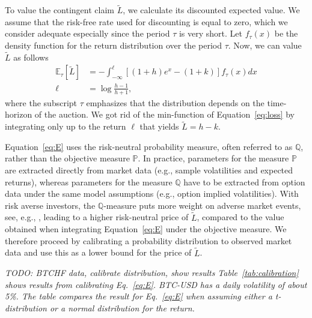 \documentclass[english,11pt]{article}
\begin{document}
To value the contingent claim $\tilde{L}$, we calculate its discounted expected
value. We assume that the risk-free rate used for discounting is equal to zero,
which we consider adequate especially since the period $\tau$ is very short.
Let $f_{\tau}(x)$ be the density function for the return distribution over the period $\tau$. Now, we can value $\tilde{L}$ as follows
\begin{align}
\mathbb{E}_{\tau}\left[\tilde{L} \right] &= - \int_{-\infty}^{\ell} \left[(1 + h) e^{x} - (1+k) \right] f_{\tau}(x) dx\label{eq:E}\\
\ell &= \log \frac{h-1}{h+1},
\end{align}
where the subscript $\tau$ emphasizes that the distribution depends on the time-horizon of the auction. We got rid of the min-function of Equation~\eqref{eq:loss} by
integrating only up to the return $\ell$ that yields $\tilde{L}=h-k$.

Equation~\eqref{eq:E} uses the risk-neutral probability measure, often referred to as
$\mathbb{Q}$, rather than the objective measure $\mathbb{P}$. In practice,
parameters for the measure $\mathbb{P}$ are extracted directly from market data
(e.g., sample volatilities and expected returns), whereas
parameters for the measure $\mathbb{Q}$ have to be extracted from option data
under the same model assumptions (e.g., option implied volatilities). 
With risk averse investors, the $\mathbb{Q}$-measure puts more
weight on adverse market events, see, e.g., \cite{breeden1978prices}, leading
to a higher risk-neutral price of $\tilde{L}$, compared to the value obtained
when integrating Equation~\eqref{eq:E} under the objective measure.
We therefore proceed by calibrating a probability distribution to observed
market data and use this as a lower bound for the price of $\tilde{L}$.



\emph{TODO: BTCHF data, calibrate distribution, show results
Table~\ref{tab:calibration} shows results
from calibrating Eq.~\eqref{eq:E}. BTC-USD has a daily volatility of about 5\%. 
The table compares the result for Eq.~\eqref{eq:E} when assuming
either a t-distribution or a normal distribution for the return.}
\end{document}
